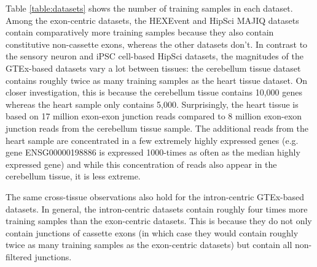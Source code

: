 Table \ref{table:datasets} shows the number of training samples in each dataset.%
Among the exon-centric datasets, the HEXEvent and HipSci MAJIQ datasets contain comparatively more training samples because they also contain constitutive non-cassette exons, whereas the other datasets don't. In contrast to the sensory neuron and iPSC cell-based HipSci datasets, the magnitudes of the GTEx-based datasets vary a lot between tissues: the cerebellum tissue dataset contains roughly twice as many training samples as the heart tissue dataset. 
On closer investigation, this is because the cerebellum tissue contains 10,000 genes whereas the heart sample only contains 5,000. Surprisingly, the heart tissue is based on 17 million exon-exon junction reads compared to 8 million exon-exon junction reads from the cerebellum tissue sample. The additional reads from the heart sample are concentrated in a few extremely highly expressed genes (e.g. gene ENSG00000198886 is expressed 1000-times as often as the median highly expressed gene) and while this concentration of reads also appear in the cerebellum tissue, it is less extreme.

The same cross-tissue observations also hold for the intron-centric GTEx-based datasets. In general, the intron-centric datasets contain roughly four times more training samples than the exon-centric datasets. This is because they do not only contain junctions of cassette exons (in which case they would contain roughly twice as many training samples as the exon-centric datasets) but contain all non-filtered junctions. 
%




